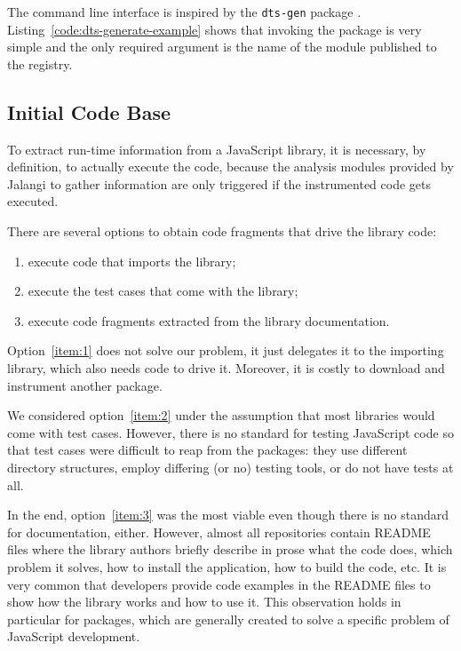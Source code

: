 \documentclass[a4paper,english,cleveref, autoref]{lipics-v2019}
\newcommand{\coderef}[1]{Listing~\ref{#1}}
\begin{document}
The command line interface is inspired by the \texttt{dts-gen} package
\cite{dts-gen}. \coderef{code:dts-generate-example} shows
that invoking the package is very simple and the only required
argument is the name of the module published to the \NPM{} registry. 


\subsection{Initial Code Base}
\label{sec:initial-code-base}

To extract run-time information from a JavaScript library, it is
necessary, by definition, to actually execute the code, because the
analysis modules provided by Jalangi to gather information are only
triggered if the instrumented code gets executed.

There are several options to obtain code fragments that drive the
library code:
\begin{enumerate}
\item\label{item:1} execute code that imports the library;
\item\label{item:2} execute the test cases that come with the library;
\item\label{item:3} execute code fragments extracted from the library documentation.
\end{enumerate}

Option~\ref{item:1} does not solve our problem, it just delegates it
to the importing library, which also needs code to drive it. Moreover,
it is costly to download and instrument another package.

We considered option~\ref{item:2} under the assumption that most
libraries would come with test cases. However, there is no standard
for testing JavaScript code so that test cases were difficult to reap
from the \NPM{} packages: they use different directory structures,
employ differing (or no) testing tools, or do not have tests
at all.

In the end, option~\ref{item:3} was the most viable even though there
is no standard for documentation, either. However, almost all repositories
contain README files where the library authors briefly describe in prose what
the code does, which problem it solves, how to install the
application, how to build the code, etc. It is very common that
developers provide code examples in the README files to show how the
library works and how to use it. This observation holds in particular
for \NPM{} packages, which are generally created to solve a specific
problem of JavaScript development. 
\end{document}
